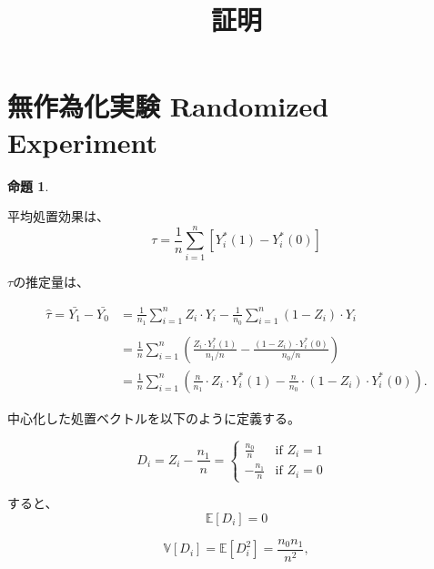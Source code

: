 \documentclass[a4paper]{bxjsarticle}
\title{証明}
\newtheorem{prop}{命題}
\begin{document}
\date{}
\maketitle
\tableofcontents

\section{無作為化実験 Randomized Experiment}

\begin{prop}
\end{prop}

平均処置効果は、
\begin{equation}
    \tau = \frac{1}{n}\sum_{i=1}^n \left[Y_i^\ast(1)-Y_i^\ast(0) \right]
\end{equation}

$\tau$の推定量は、

\begin{equation}
    \begin{split}
    \hat{\tau} = \bar{Y_1} - \bar{Y_0} &= \frac{1}{n_1}\sum_{i=1}^n Z_i \cdot Y_i - \frac{1}{n_0}\sum_{i=1}^n (1-Z_i) \cdot Y_i \\\\
    &= \frac{1}{n}\sum_{i=1}^n \left( \frac{Z_i \cdot Y_i^\ast(1)}{n_1/n}-\frac{(1-Z_i) \cdot Y_i^\ast(0)}{n_0/n} \right) \\\
    &= \frac{1}{n} \sum_{i=1}^n \left(\frac{n}{n_1} \cdot Z_i \cdot Y_i^\ast(1) - \frac{n}{n_0} \cdot (1-Z_i) \cdot Y_i^\ast(0) \right).
    \end{split}
\end{equation}


中心化した処置ベクトルを以下のように定義する。

\begin{equation}
 D_i = Z_i- \frac{n_1}{n}　=　
  \begin{cases}
   \frac{n_0}{n} & \text{if $Z_i = 1$ } \\
   -\frac{n_1}{n} & \text{if $Z_i = 0$}
  \end{cases}
\end{equation}

すると、
\begin{equation}
    \mathbb{E}\left[D_i\right] = 0
\end{equation}

\begin{equation}
    \mathbb{V}\left[D_i\right] = \mathbb{E}\left[D_i^2\right] = \frac{n_0 n_1}{n^2},
\end{equation}
\end{document}
